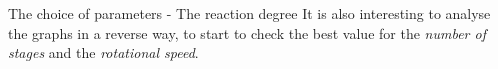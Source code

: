 \documentclass{beamer}
\begin{document}
\begin{frame}[t]{The choice of parameters - The reaction degree}
It is also interesting to analyse the graphs in a reverse way, to start to check the best value for the \emph{number of stages} and the \emph{rotational speed}.

\vspace{-0.5cm}
\begin{figure}%
    \centering
\end{figure}
\end{frame}
\end{document}
